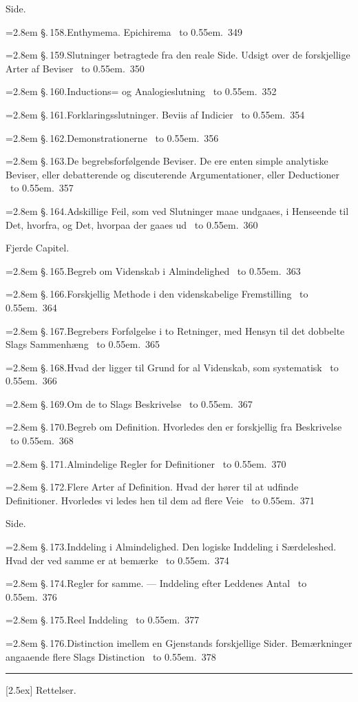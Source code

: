 \documentclass[12pt]{book}
\def\sperr#1{#1}%
\def\textit#1{#1}%
\def\\{ }%
\newcommand{\sperr}[1]{\textls[180]{#1}}
\newcommand{\ovside}{\par\nopagebreak\hfill{\footnotesize Side.}\par\nobreak\vspace{0.2\baselineskip}}
\newcommand{\ovcap}[2]{%
  \par\vspace{1.0\baselineskip}%
  \begin{center}{\sperr{#1}\par}\vspace{0.3\baselineskip}{#2\par}\end{center}
  \vspace{0.4\baselineskip}}
\newcommand{\ovline}[3]{%
  \par\vspace{0.25\baselineskip}%
  \noindent\hangindent=2.8em\hangafter=1
  \textit{\S.\,#1.}\quad #2%
  \nobreak\ \leaders\hbox to 0.55em{\hss.\hss}\hfill\ \textit{#3}\par}
\begin{document}
\ovside
\ovline{158}{Enthymema. Epichirema}{349}
\ovline{159}{Slutninger betragtede fra den reale Side. Udsigt over de
  forskjellige Arter af Beviser}{350}
\ovline{160}{Inductions= og Analogieslutning}{352}
\ovline{161}{Forklaringsslutninger. Beviis af Indicier}{354}
\ovline{162}{Demonstrationerne}{356}
\ovline{163}{De begrebsforfølgende Beviser. De ere enten simple analytiske
  Beviser, eller debatterende og discuterende Argumentationer, eller
  Deductioner}{357}
\ovline{164}{Adskillige Feil, som ved Slutninger maae undgaaes, i Henseende
  til Det, hvorfra, og Det, hvorpaa der gaaes ud}{360}

\ovcap{Fjerde Capitel.}{Om videnskabelig Fremstilling i Almindelighed og
  Beskrivelse, Definition og Inddeling i Særdeleshed.}

\ovline{165}{Begreb om Videnskab i Almindelighed}{363}
\ovline{166}{Forskjellig Methode i den videnskabelige Fremstilling}{364}
\ovline{167}{Begrebers Forfølgelse i to Retninger, med Hensyn til det dobbelte
  Slags Sammenhæng}{365}
\ovline{168}{Hvad der ligger til Grund for al Videnskab, som systematisk}{366}
\ovline{169}{Om de to Slags Beskrivelse}{367}
\ovline{170}{Begreb om \sperr{Definition}. Hvorledes den er forskjellig fra
  Beskrivelse}{368}
\ovline{171}{Almindelige Regler for Definitioner}{370}
\ovline{172}{Flere Arter af Definition. Hvad der hører til at udfinde
  Definitioner. Hvorledes vi ledes hen til dem ad flere Veie}{371}

\ovside
\ovline{173}{Inddeling i Almindelighed. Den logiske Inddeling i Særdeleshed.
  Hvad der ved samme er at bemærke}{374}
\ovline{174}{Regler for samme. --- Inddeling efter Leddenes Antal}{376}
\ovline{175}{Reel Inddeling}{377}
\ovline{176}{Distinction imellem en Gjenstands forskjellige Sider.
  Bemærkninger angaaende flere Slags Distinction}{378}

\begin{center}
  \rule{0.34\linewidth}{0.4pt}\\[2.5ex]
  {\large\sperr{Rettelser.}}
\end{center}
\end{document}
